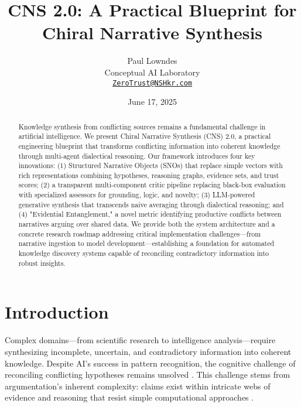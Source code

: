 \documentclass[12pt, a4paper]{article}
\title{\textbf{CNS 2.0: A Practical Blueprint for Chiral Narrative Synthesis}}
\author{
    Paul Lowndes \\
    \small Conceptual AI Laboratory \\
    \small \href{mailto:ZeroTrust@NSHkr.com}{\texttt{ZeroTrust@NSHkr.com}}
}
\date{June 17, 2025}
\begin{document}
\maketitle
\vspace{-2em}

\begin{abstract}
Knowledge synthesis from conflicting sources remains a fundamental challenge in artificial intelligence. We present Chiral Narrative Synthesis (CNS) 2.0, a practical engineering blueprint that transforms conflicting information into coherent knowledge through multi-agent dialectical reasoning. Our framework introduces four key innovations: (1) Structured Narrative Objects (SNOs) that replace simple vectors with rich representations combining hypotheses, reasoning graphs, evidence sets, and trust scores; (2) a transparent multi-component critic pipeline replacing black-box evaluation with specialized assessors for grounding, logic, and novelty; (3) LLM-powered generative synthesis that transcends naive averaging through dialectical reasoning; and (4) "Evidential Entanglement," a novel metric identifying productive conflicts between narratives arguing over shared data. We provide both the system architecture and a concrete research roadmap addressing critical implementation challenges—from narrative ingestion to model development—establishing a foundation for automated knowledge discovery systems capable of reconciling contradictory information into robust insights.
\end{abstract}

\section{Introduction}
Complex domains—from scientific research to intelligence analysis—require synthesizing incomplete, uncertain, and contradictory information into coherent knowledge. Despite AI's success in pattern recognition, the cognitive challenge of reconciling conflicting hypotheses remains unsolved \cite{Boström2017}. This challenge stems from argumentation's inherent complexity: claims exist within intricate webs of evidence and reasoning that resist simple computational approaches \cite{Toulmin2003}. 
\end{document}
